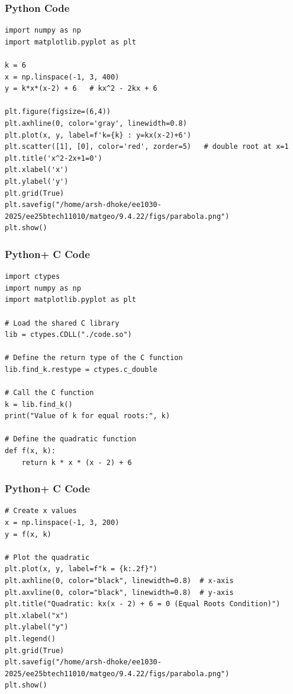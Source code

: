 \documentclass{beamer}
\begin{document}
\begin{frame}[fragile]
    \frametitle{Python Code}
\begin{lstlisting}
import numpy as np
import matplotlib.pyplot as plt

k = 6
x = np.linspace(-1, 3, 400)
y = k*x*(x-2) + 6   # kx^2 - 2kx + 6

plt.figure(figsize=(6,4))
plt.axhline(0, color='gray', linewidth=0.8)
plt.plot(x, y, label=f'k={k} : y=kx(x-2)+6')
plt.scatter([1], [0], color='red', zorder=5)   # double root at x=1
plt.title('x^2-2x+1=0')
plt.xlabel('x')
plt.ylabel('y')
plt.grid(True)
plt.savefig("/home/arsh-dhoke/ee1030-2025/ee25btech11010/matgeo/9.4.22/figs/parabola.png")
plt.show()

\end{lstlisting}
\end{frame}

\begin{frame}[fragile]
    \frametitle{Python+ C Code}
\begin{lstlisting}
import ctypes
import numpy as np
import matplotlib.pyplot as plt

# Load the shared C library
lib = ctypes.CDLL("./code.so")

# Define the return type of the C function
lib.find_k.restype = ctypes.c_double

# Call the C function
k = lib.find_k()
print("Value of k for equal roots:", k)

# Define the quadratic function
def f(x, k):
    return k * x * (x - 2) + 6
\end{lstlisting}
\end{frame}

\begin{frame}[fragile]
    \frametitle{Python+ C Code}
\begin{lstlisting}
# Create x values
x = np.linspace(-1, 3, 200)
y = f(x, k)

# Plot the quadratic
plt.plot(x, y, label=f"k = {k:.2f}")
plt.axhline(0, color="black", linewidth=0.8)  # x-axis
plt.axvline(0, color="black", linewidth=0.8)  # y-axis
plt.title("Quadratic: kx(x - 2) + 6 = 0 (Equal Roots Condition)")
plt.xlabel("x")
plt.ylabel("y")
plt.legend()
plt.grid(True)
plt.savefig("/home/arsh-dhoke/ee1030-2025/ee25btech11010/matgeo/9.4.22/figs/parabola.png")
plt.show()

\end{lstlisting}
\end{frame}
\end{document}
